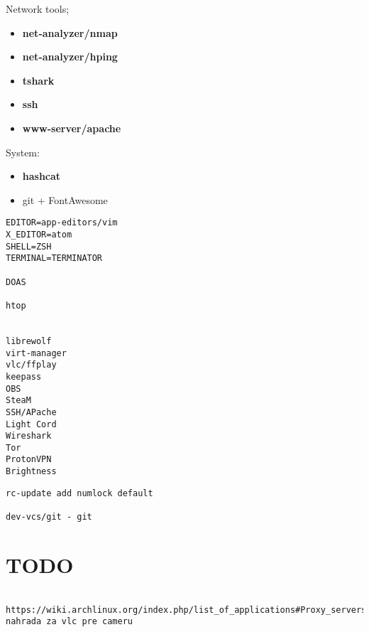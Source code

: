 \documentclass[10pt, a4paper, onecolumn, openany]{book}         %
\begin{document}
%

Network tools;
\begin{itemize}
    \item \textbf{net-analyzer/nmap}
    \item \textbf{net-analyzer/hping}
    \item \textbf{tshark}
    \item \textbf{ssh}
    \item \textbf{www-server/apache}
    
\end{itemize}



System:
\begin{itemize}


    \item \textbf{hashcat}
    \item git + FontAwesome
\end{itemize}



\begin{Verbatim}[commandchars=\\\{\}]
EDITOR=app-editors/vim
X_EDITOR=atom
SHELL=ZSH
TERMINAL=TERMINATOR

DOAS

htop


librewolf
virt-manager
vlc/ffplay
keepass
OBS
SteaM
SSH/APache
Light Cord
Wireshark
Tor
ProtonVPN
Brightness
\end{Verbatim}

\begin{Verbatim}[commandchars=\\\{\}]
rc-update add numlock default

dev-vcs/git - git
\end{Verbatim}


\section{TODO}
\begin{Verbatim}[commandchars=\\\{\}]

https://wiki.archlinux.org/index.php/list_of_applications#Proxy_servers
nahrada za vlc pre cameru
\end{Verbatim}
\end{document}
